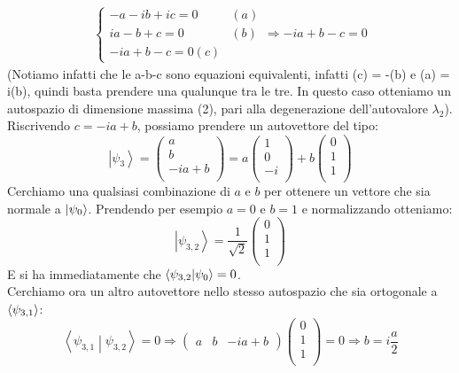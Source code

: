 \begin{enumerate}
\begin{itemize}
\begin{align*}
	\begin{cases}
	-a -ib +ic = 0 & (a)\\
	ia -b +c =0 & (b)\\
	-ia +b -c = 0 (c)
	\end{cases}
	\Rightarrow 
	-ia+b -c=0
	\end{align*}
	(Notiamo infatti che le a-b-c sono equazioni equivalenti, infatti (c) = -(b) e (a) = i(b), quindi basta prendere una qualunque tra le tre. In questo caso otteniamo un autospazio di dimensione massima (2), pari alla degenerazione dell'autovalore $\lambda_2$).\\
	Riscrivendo $c = -ia + b$, possiamo prendere un autovettore del tipo:
	\[
	\left|\psi_3\right\rangle= \left(\begin{matrix}a\\b\\-ia+b\\\end{matrix}\right)=a\left(\begin{matrix}1\\0\\-i\\\end{matrix}\right)+b\left(\begin{matrix}0\\1\\1\\\end{matrix}\right)
	\]
	Cerchiamo una qualsiasi combinazione di $a$ e $b$ per ottenere un vettore che sia normale a $\ket{\psi_0}$. Prendendo per esempio $a=0$ e $b=1$ e normalizzando otteniamo:
	\[
	\left|\psi_{3,2}\right\rangle=\frac{1}{\sqrt2}\left(\begin{matrix}0\\1\\1\\\end{matrix}\right)
	\]
	E si ha immediatamente che $\braket{\psi_{3,2}|\psi_0} = 0$.\\
	Cerchiamo ora un altro autovettore nello stesso autospazio che sia ortogonale a $\braket{\psi_{3,1}}$:
	\[
	\left\langle\psi_{3,1}\middle|\psi_{3,2}\right\rangle=0 \Rightarrow
	\begin{pmatrix}a&b&-ia+b\end{pmatrix}\left(\begin{matrix}0\\1\\1\\\end{matrix}\right)=0\Rightarrow b=i \frac{a}{2}
\]
\end{itemize}
\end{enumerate}
